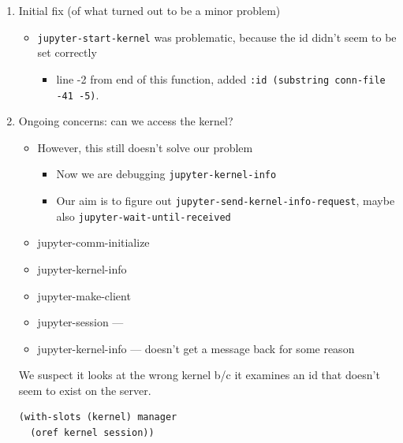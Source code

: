 \documentclass[11pt]{article}
\begin{document}
\begin{enumerate}
\item Initial fix (of what turned out to be a minor problem)
\label{sec:org25bf8ea}
\begin{itemize}
\item \texttt{jupyter-start-kernel} was problematic, because the id didn’t seem to be set correctly
\begin{itemize}
\item line -2 from end of this function, added \texttt{:id (substring conn-file -41 -5)}.
\end{itemize}
\end{itemize}

\item Ongoing concerns: can we access the kernel?
\label{sec:orgf036267}
\begin{itemize}
\item However, this still doesn’t solve our problem
\begin{itemize}
\item Now we are debugging \texttt{jupyter-kernel-info}
\item Our aim is to figure out \texttt{jupyter-send-kernel-info-request}, maybe also \texttt{jupyter-wait-until-received}
\end{itemize}

\item jupyter-comm-initialize
\item jupyter-kernel-info
\item jupyter-make-client
\item jupyter-session —
\item jupyter-kernel-info — doesn’t get a message back for some reason
\end{itemize}

We suspect it looks at the wrong kernel b/c it examines an id that
doesn’t seem to exist on the server.

\begin{verbatim}
(with-slots (kernel) manager
  (oref kernel session))
\end{verbatim}
\end{enumerate}
\end{document}
